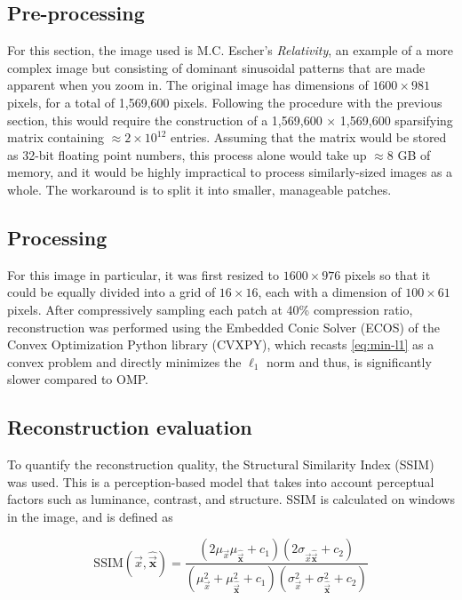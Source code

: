 \subsection{Pre-processing}
\label{ssec:image-multi-preprocess}
For this section, the image used is M.C. Escher's \textit{Relativity}, an example of a more complex image but consisting of dominant sinusoidal patterns that are made apparent when you zoom in. The original image has dimensions of $1600 \times 981$ pixels, for a total of 1,569,600 pixels. Following the procedure with the previous section, this would require the construction of a 1,569,600 $\times$ 1,569,600 sparsifying matrix containing $\approx 2 \times 10^{12}$ entries. Assuming that the matrix would be stored as 32-bit floating point numbers, this process alone would take up $\approx 8$ GB of memory, and it would be highly impractical to process similarly-sized images as a whole. The workaround is to split it into smaller, manageable patches. 

\subsection{Processing}
\label{ssec:image-multi-process}
For this image in particular, it was first resized to $1600 \times 976$ pixels so that it could be equally divided into a grid of $16 \times 16$, each with a dimension of $100 \times 61$ pixels. After compressively sampling each patch at 40\% compression ratio, reconstruction was performed using the Embedded Conic Solver (ECOS) of the Convex Optimization Python library (CVXPY), which recasts \eqref{eq:min-l1} as a convex problem and directly minimizes the $\ell_1$ norm \cite{ecos,cvxpy,cvxpy_rewriting} and thus, is significantly slower compared to OMP.

\subsection{Reconstruction evaluation}
\label{ssec:image-multi-error}
To quantify the reconstruction quality, the Structural Similarity Index (SSIM) \cite{Wang2004} was used. This is a perception-based model that takes into account perceptual factors such as luminance, contrast, and structure. SSIM is calculated on windows in the image, and is defined as

\begin{equation}
	\label{eq:ssim}
	\mathrm{SSIM}(\vec{x}, \bm\hat{\vec{x}}) = \frac{(2\mu_{\vec{x}}\mu_{\bm\hat{\vec{x}}} + c_1) (2\sigma_{\vec{x} \bm\hat{\vec{x}}} + c_2)}{(\mu_{\vec{x}}^2 + \mu_{\bm\hat{\vec{x}}}^2 + c_1) (\sigma_{\vec{x}}^2 + \sigma_{\bm\hat{\vec{x}}}^2 + c_2)}
\end{equation}

